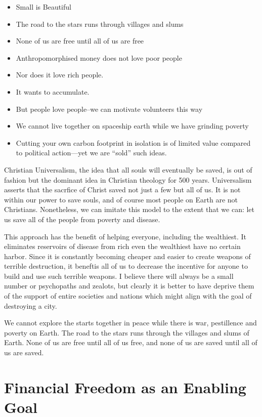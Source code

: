 \documentclass[
	fontsize=10pt, %
	twoside=false, %
	secnumdepth=1, %
]{kaobook}
\begin{document}
\begin{itemize}
\item Small is Beautiful
\item The road to the stars runs through villages and slums
\item None of us are free until all of us are free
\item Anthropomorphised money does not love poor people
\item Nor does it love rich people.
\item It wants to accumulate.
\item But people love people--we can motivate volunteers this way
\item We cannot live together on spaceship earth while we have grinding poverty
\item Cutting your own carbon footprint in isolation is of limited value compared to political action---yet we are “sold” such ideas.
\end{itemize}

Christian Universalism, the idea that all souls will eventually be saved,
is out of fashion but the dominant idea in Christian theology for
500 years\cite{hart2019all}.
Universalism asserts that the sacrfice of Christ saved not just a few
but all of us.
It is not within our power to save souls, and of course most
people on Earth are not Christians.
Nonetheless, we can imitate this model to the extent that we can:
let us save all of the people from poverty and disease.

This approach has the benefit of helping everyone, including
the wealthiest.
It eliminates reservoirs of disease from rich even the wealthiest
have no certain harbor.
Since it is constantly becoming cheaper and easier to create
weapons of terrible destruction, it beneftis all of us to
decrease the incentive for anyone to build and use such
terrible weapons.
I believe there will always be a small number or psychopaths
and zealots, but clearly it is better to have deprive them
of the support of entire societies and nations which might
align with the goal of destroying a city.

We cannot explore the starts together in peace while
there is war, pestillence and poverty on Earth.
The road to the stars runs through the villages and slums
of Earth. None of us are free until all of us free,
and none of us are saved until all of us are saved.

\chapter{Financial Freedom as an Enabling Goal}
\end{document}
